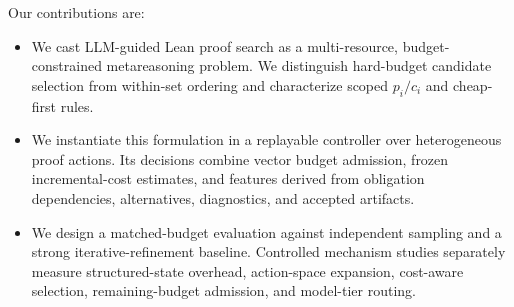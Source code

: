 Our contributions are:

\begin{itemize}
    \item We cast LLM-guided Lean proof search as a multi-resource,
    budget-constrained metareasoning problem. We distinguish hard-budget
    candidate selection from within-set ordering and characterize scoped
    \(p_i/c_i\) and cheap-first rules.
    \item We instantiate this formulation in a replayable controller over
    heterogeneous proof actions. Its decisions combine vector budget
    admission, frozen incremental-cost estimates, and features derived from
    obligation dependencies, alternatives, diagnostics, and accepted
    artifacts.
    \item We design a matched-budget evaluation against independent sampling
    and a strong iterative-refinement baseline. Controlled mechanism studies
    separately measure structured-state overhead, action-space expansion,
    cost-aware selection, remaining-budget admission, and model-tier routing.
\end{itemize}
